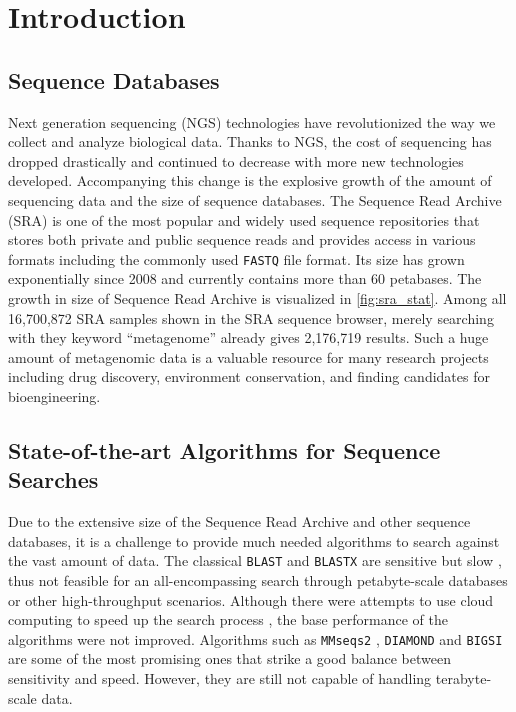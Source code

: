
\chapter{Introduction}
\section{Sequence Databases}

Next generation sequencing (NGS) technologies have revolutionized the way we collect and analyze biological data.
Thanks to NGS, the cost of sequencing has dropped drastically and continued to decrease with more new technologies developed.
Accompanying this change is the explosive growth of the amount of sequencing data and the size of sequence databases.
The Sequence Read Archive (SRA) is one of the most popular and widely used sequence repositories that stores both private and public sequence reads and provides access in various formats including the commonly used \texttt{FASTQ} file format.
Its size has grown exponentially since 2008 and currently contains more than 60 petabases.
The growth in size of Sequence Read Archive is visualized in \autoref{fig:sra_stat}.
Among all 16,700,872 SRA samples shown in the SRA sequence browser, merely searching with they keyword ``metagenome'' already gives 2,176,719 results.
Such a huge amount of metagenomic data is a valuable resource for many research projects including drug discovery, environment conservation, and finding candidates for bioengineering.

\section{State-of-the-art Algorithms for Sequence Searches}

Due to the extensive size of the Sequence Read Archive and other sequence databases, it is a challenge to provide much needed algorithms to search against the vast amount of data.
The classical \texttt{BLAST} and \texttt{BLASTX} are sensitive but slow \cite{altschul_basic_1990}, thus not feasible for an all-encompassing search through petabyte-scale databases or other high-throughput scenarios.
Although there were attempts to use cloud computing to speed up the search process \cite{levi_searching_2018}, the base performance of the algorithms were not improved.
Algorithms such as \texttt{MMseqs2} \cite{steinegger_mmseqs2_2017}, \texttt{DIAMOND} \cite{buchfink_fast_2015} and \texttt{BIGSI} \cite{bradley_ultrafast_2019} are some of the most promising ones that strike a good balance between sensitivity and speed.
However, they are still not capable of handling terabyte-scale data.

